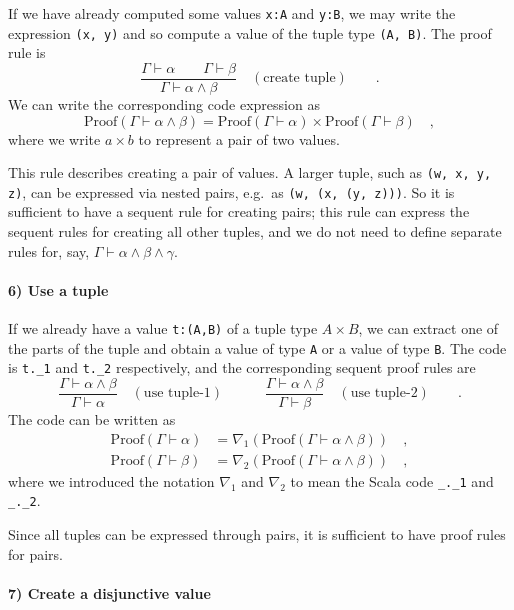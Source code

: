 If we have already computed some values \lstinline!x:A! and \lstinline!y:B!,
we may write the expression \lstinline!(x, y)! and so compute a value
of the tuple type \lstinline!(A, B)!. The proof rule is
\[
\frac{\Gamma\vdash\alpha\quad\quad\Gamma\vdash\beta}{\Gamma\vdash\alpha\wedge\beta}\quad(\text{create tuple})\quad\quad.
\]
We can write the corresponding code expression as
\[
\text{Proof}\left(\Gamma\vdash\alpha\wedge\beta\right)=\text{Proof}\left(\Gamma\vdash\alpha\right)\times\text{Proof}\left(\Gamma\vdash\beta\right)\quad,
\]
where we write $a\times b$ to represent a pair of two values.

This rule describes creating a pair of values. A larger tuple, such
as \lstinline!(w, x, y, z)!, can be expressed via nested pairs, e.g.~as
\lstinline!(w, (x, (y, z)))!. So it is sufficient to have a sequent
rule for creating pairs; this rule can express the sequent rules for
creating all other tuples, and we do not need to define separate rules
for, say, $\Gamma\vdash\alpha\wedge\beta\wedge\gamma$.

\paragraph{6) Use a tuple}

If we already have a value \lstinline!t:(A,B)! of a tuple type $A\times B$,
we can extract one of the parts of the tuple and obtain a value of
type \lstinline!A! or a value of type \lstinline!B!. The code is
\lstinline!t._1! and \lstinline!t._2! respectively, and the corresponding
sequent proof rules are
\[
\frac{\Gamma\vdash\alpha\wedge\beta}{\Gamma\vdash\alpha}\quad(\text{use tuple-}1)\quad\quad\quad\frac{\Gamma\vdash\alpha\wedge\beta}{\Gamma\vdash\beta}\quad(\text{use tuple-}2)\quad\quad.
\]
The code can be written as
\begin{align*}
\text{Proof}\left(\Gamma\vdash\alpha\right) & =\nabla_{1}\left(\text{Proof}\left(\Gamma\vdash\alpha\wedge\beta\right)\right)\quad,\\
\text{Proof}\left(\Gamma\vdash\beta\right) & =\nabla_{2}\left(\text{Proof}\left(\Gamma\vdash\alpha\wedge\beta\right)\right)\quad,
\end{align*}
where we introduced the notation $\nabla_{1}$ and $\nabla_{2}$ to
mean the Scala code \lstinline!_._1! and \lstinline!_._2!.

Since all tuples can be expressed through pairs, it is sufficient
to have proof rules for pairs.

\paragraph{7) Create a disjunctive value}

